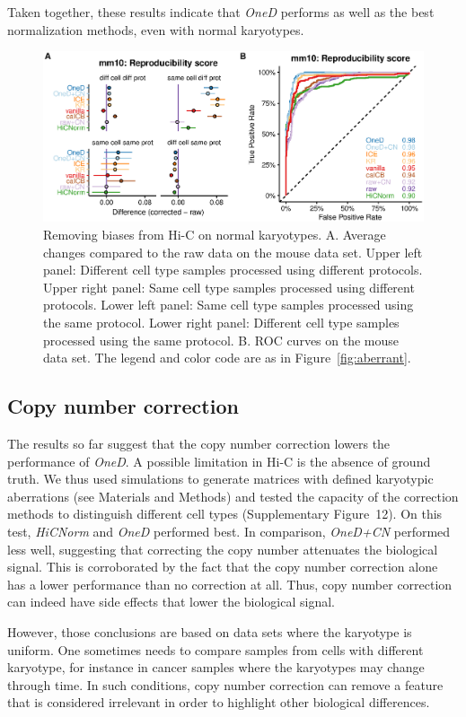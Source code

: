 \documentclass[a4,center,fleqn]{NAR}
\begin{document}
Taken together, these results indicate that \textit{OneD} performs as well
as the best normalization methods, even with normal karyotypes.

\begin{figure}
\centerline{\includegraphics[width=.49\textwidth]
  {nar_figures/figure_3.eps}}
\caption{Removing biases from Hi-C on normal karyotypes. A. Average
  changes compared to the raw data on the mouse data set.
  Upper left panel: Different cell type samples
processed using different protocols. Upper right panel: Same cell
type samples processed using different protocols. Lower left panel:
Same cell type samples processed using the same protocol. Lower right panel:
Different cell type samples processed using the same protocol. B. ROC curves on
the mouse data set. The legend and color code are as in Figure~\ref{fig:aberrant}.}
\label{fig:normal}
\end{figure}


\subsection{Copy number correction}

The results so far suggest that the copy number correction lowers the
performance of \textit{OneD}. A possible limitation in Hi-C is the absence
of ground truth. We thus used simulations to generate matrices with
defined karyotypic aberrations (see Materials and Methods) and tested the
capacity of the correction methods to distinguish different cell types
(Supplementary Figure~12). On this test, \textit{HiCNorm} and \textit{OneD}
performed best. In comparison, \textit{OneD+CN} performed less well,
suggesting that correcting the copy number attenuates the biological
signal. This is corroborated by the fact that the copy number correction
alone has a lower performance than no correction at all. Thus, copy number
correction can indeed have side effects that lower the biological signal.

However, those conclusions are based on data sets where the karyotype is
uniform. One sometimes needs to compare samples from cells with different
karyotype, for instance in cancer samples where the karyotypes may change
through time. In such conditions, copy number correction can remove a
feature that is considered irrelevant in order to highlight other
biological differences.
\end{document}
